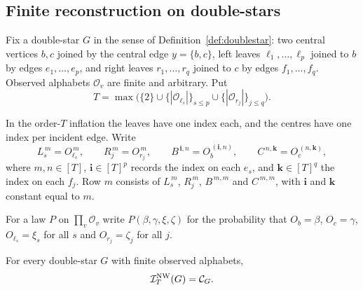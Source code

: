 \subsection{Finite reconstruction on double-stars}\label{sec:doublestar}

\providecommand{\Cscen}[1]{\mathcal C_{#1}}
\providecommand{\supp}{\operatorname{supp}}

Fix a double-star $G$ in the sense of Definition~\ref{def:doublestar}: two central vertices $b,c$ joined by the central edge $y=\{b,c\}$, left leaves $\ell_1,\dots,\ell_p$ joined to $b$ by edges $e_1,\dots,e_p$, and right leaves $r_1,\dots,r_q$ joined to $c$ by edges $f_1,\dots,f_q$. Observed alphabets $\mathcal O_v$ are finite and arbitrary. Put
\[
T=\max\bigl(\{2\}\cup\{|\mathcal O_{\ell_s}|\}_{s\le p}\cup\{|\mathcal O_{r_j}|\}_{j\le q}\bigr).
\]

In the order-$T$ inflation the leaves have one index each, and the centres have one index per incident edge. Write
\[
L_s^{\,m}=O_{\ell_s}^{\,m},\qquad R_j^{\,m}=O_{r_j}^{\,m},\qquad
B^{\,\mathbf i,n}=O_b^{\,(\mathbf i,n)},\qquad C^{\,n,\mathbf k}=O_c^{\,(n,\mathbf k)},
\]
where $m,n\in[T]$, $\mathbf i\in[T]^p$ records the index on each $e_s$, and $\mathbf k\in[T]^q$ the index on each $f_j$. Row $m$ consists of $L_s^{\,m}$, $R_j^{\,m}$, $B^{\,m,m}$ and $C^{\,m,m}$, with $\mathbf i$ and $\mathbf k$ constant equal to $m$.

For a law $P$ on $\prod_v\mathcal O_v$ write $P(\beta,\gamma,\xi,\zeta)$ for the probability that $O_b=\beta$, $O_c=\gamma$, $O_{\ell_s}=\xi_s$ for all $s$ and $O_{r_j}=\zeta_j$ for all $j$.

\begin{theorem}\label{thm:doublestar}
For every double-star $G$ with finite observed alphabets,
\[
\INW_T(G)=\Cscen{G}.
\]
\end{theorem}

